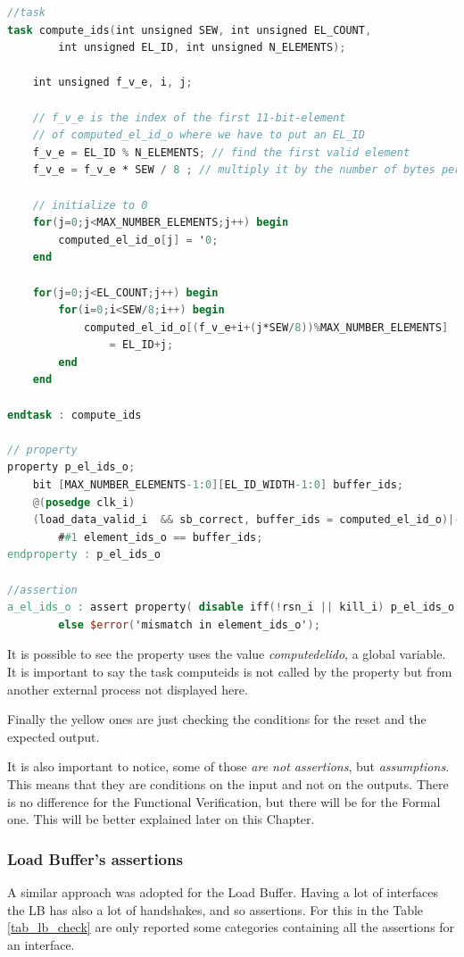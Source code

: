 \newpage
\linespread{1}
\begin{lstlisting}[language=Verilog,style=verilog-style, backgroundcolor=\color{lyel_palette}, frame=tlb]
//task
task compute_ids(int unsigned SEW, int unsigned EL_COUNT, 
	    int unsigned EL_ID, int unsigned N_ELEMENTS);

    int unsigned f_v_e, i, j;
		
    // f_v_e is the index of the first 11-bit-element 
    // of computed_el_id_o where we have to put an EL_ID
	f_v_e = EL_ID % N_ELEMENTS; // find the first valid element 
	f_v_e = f_v_e * SEW / 8 ; // multiply it by the number of bytes per el
		
	// initialize to 0
	for(j=0;j<MAX_NUMBER_ELEMENTS;j++) begin
	    computed_el_id_o[j] = '0;
	end

	for(j=0;j<EL_COUNT;j++) begin
		for(i=0;i<SEW/8;i++) begin
			computed_el_id_o[(f_v_e+i+(j*SEW/8))%MAX_NUMBER_ELEMENTS] 
			    = EL_ID+j;
		end
	end

endtask : compute_ids

// property
property p_el_ids_o;
	bit [MAX_NUMBER_ELEMENTS-1:0][EL_ID_WIDTH-1:0] buffer_ids;
	@(posedge clk_i)
	(load_data_valid_i  && sb_correct, buffer_ids = computed_el_id_o)|-> 
        ##1 element_ids_o == buffer_ids;
endproperty : p_el_ids_o

//assertion
a_el_ids_o : assert property( disable iff(!rsn_i || kill_i) p_el_ids_o ) 
        else $error('mismatch in element_ids_o');
\end{lstlisting}
\linespread{1.2}
\bigskip

It is possible to see the property uses the value \textit{computed\+el\+id\+o}, a global variable. It is important to say the task compute\+ids is not called by the property but from another external process not displayed here.

Finally the yellow ones are just checking the conditions for the reset and the expected output.

It is also important to notice, some of those \textit{are not assertions}, but \textit{assumptions}. This means that they are conditions on the input and not on the outputs. There is no difference for the Functional Verification, but there will be for the Formal one. This will be better explained later on this Chapter.



\subsubsection{Load Buffer's assertions}
A similar approach was adopted for the Load Buffer. Having a lot of interfaces the LB has also a lot of handshakes, and so assertions. For this in the Table \ref{tab_lb_check} are only reported some categories containing all the assertions for an interface.



